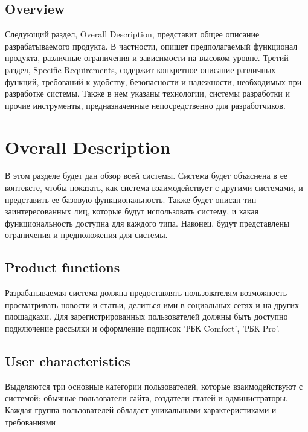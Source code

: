 \documentclass{scrreprt}
\begin{document}
\section{Overview}
Следующий раздел, Overall Description, представит общее описание разрабатываемого
продукта. В частности, опишет предполагаемый функционал продукта, различные
ограничения и зависимости на высоком уровне.
Третий раздел, Specific Requirements, содержит конкретное описание различных функций,
требований к удобству, безопасности и надежности, необходимых при разработке системы.
Также в нем указаны технологии, системы разработки и прочие инструменты,
предназначенные непосредственно для разработчиков.

\chapter{Overall Description}
В этом разделе будет дан обзор всей системы. Система будет объяснена в ее контексте, чтобы показать, как система взаимодействует с другими системами, и представить ее базовую функциональность. Также будет
описан тип заинтересованных лиц, которые будут использовать систему, и какая функциональность доступна для каждого типа. Наконец, будут представлены ограничения и предположения для 	системы.
\section{Product functions}

Разрабатываемая система должна предоставлять пользователям возможность
просматривать новости и статьи, делиться ими в
социальных сетях и на других площадкахи. Для
зарегистрированных пользователей должны быть доступно подключение рассылки и оформление подписок 'РБК Comfort', 'РБК Pro'.

\section{User characteristics}
Выделяются три основные категории пользователей, которые взаимодействуют с системой: обычные пользователи сайта, создатели статей и администраторы. Каждая группа пользователей обладает уникальными характеристиками и требованиями
\end{document}
